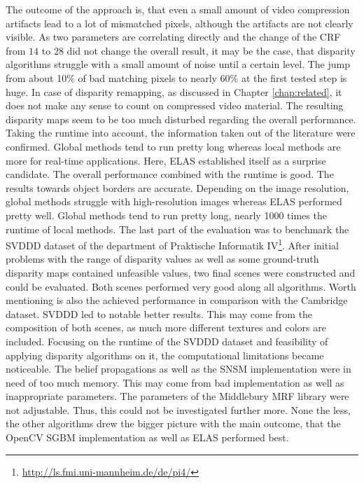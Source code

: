 The outcome of the approach is, that even a small amount of video compression artifacts lead to a lot of mismatched pixels, although the artifacts are not clearly visible.
As two parameters are correlating directly and the change of the CRF from $14$ to $28$ did not change the overall result, it may be the case, that disparity algorithms struggle with a small amount of noise until a certain level.
The jump from about 10\% of bad matching pixels to nearly 60\% at the first tested step is huge.
In case of disparity remapping, as discussed in Chapter \ref{chap:related}, it does not make any sense to count on compressed video material.
The resulting disparity maps seem to be too much disturbed regarding the overall performance.
\newline\newline\noindent Taking the runtime into account, the information taken out of the literature were confirmed.
Global methods tend to run pretty long whereas local methods are more for real-time applications.
Here, ELAS established itself as a surprise candidate.
The overall performance combined with the runtime is good.
The results towards object borders are accurate.
Depending on the image resolution, global methods struggle with high-resolution images whereas ELAS performed pretty well.
Global methods tend to run pretty long, nearly 1000 times the runtime of local methods.
\newline\newline\noindent The last part of the evaluation was to benchmark the SVDDD dataset of the department of Praktische Informatik IV\footnote{\url{http://ls.fmi.uni-mannheim.de/de/pi4/}}.
After initial problems with the range of disparity values as well as some ground-truth disparity maps contained unfeasible values, two final scenes were constructed and could be evaluated.
Both scenes performed very good along all algorithms.
Worth mentioning is also the achieved performance in comparison with the Cambridge dataset.
SVDDD led to notable better results.
This may come from the composition of both scenes, as much more different textures and colors are included.
Focusing on the runtime of the SVDDD dataset and feasibility of applying disparity algorithms on it, the computational limitations became noticeable.
The belief propagations as well as the SNSM implementation were in need of too much memory.
This may come from bad implementation as well as inappropriate parameters.
The parameters of the Middlebury MRF library were not adjustable.
Thus, this could not be investigated further more.
None the less, the other algorithms drew the bigger picture with the main outcome, that the OpenCV SGBM implementation as well as ELAS performed best.
